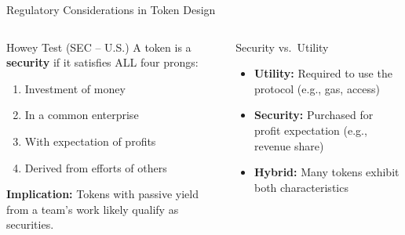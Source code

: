 \documentclass[8pt,aspectratio=169]{beamer}
\begin{document}
\begin{frame}{Regulatory Considerations in Token Design}
\begin{columns}[T]
\begin{block}{Howey Test (SEC -- U.S.)}
\footnotesize
A token is a \textbf{security} if it satisfies ALL four prongs:
\begin{enumerate}
  \item Investment of money
  \item In a common enterprise
  \item With expectation of profits
  \item Derived from efforts of others
\end{enumerate}
\vspace{1mm}
\textbf{Implication:} Tokens with passive yield from a team's work likely qualify as securities.
\end{block}
\vspace{1mm}
\begin{exampleblock}{\footnotesize Security vs.\ Utility}
\footnotesize
\begin{itemize}
  \item \textbf{Utility:} Required to use the protocol (e.g., gas, access)
  \item \textbf{Security:} Purchased for profit expectation (e.g., revenue share)
  \item \textbf{Hybrid:} Many tokens exhibit both characteristics
\end{itemize}
\end{exampleblock}


\end{columns}
\end{frame}
\end{document}

